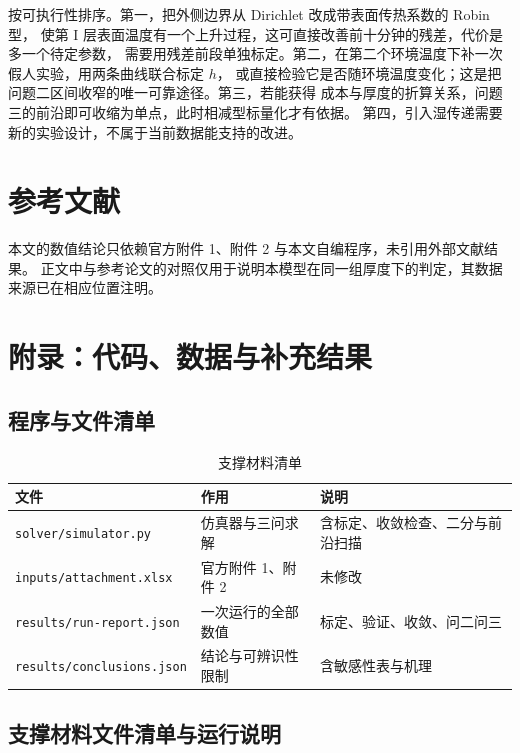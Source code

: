 \documentclass[withoutpreface,bwprint]{cumcmthesis}
\begin{document}
按可执行性排序。第一，把外侧边界从 Dirichlet 改成带表面传热系数的 Robin 型，
使第 I 层表面温度有一个上升过程，这可直接改善前十分钟的残差，代价是多一个待定参数，
需要用残差前段单独标定。第二，在第二个环境温度下补一次假人实验，用两条曲线联合标定 $h$，
或直接检验它是否随环境温度变化；这是把问题二区间收窄的唯一可靠途径。第三，若能获得
成本与厚度的折算关系，问题三的前沿即可收缩为单点，此时相减型标量化才有依据。
第四，引入湿传递需要新的实验设计，不属于当前数据能支持的改进。

\label{mcm-body-end}
\section{参考文献}

本文的数值结论只依赖官方附件 1、附件 2 与本文自编程序，未引用外部文献结果。
正文中与参考论文的对照仅用于说明本模型在同一组厚度下的判定，其数据来源已在相应位置注明。

\section{附录：代码、数据与补充结果}

\subsection{程序与文件清单}

\begin{table}[htbp]
  \centering
  \caption{支撑材料清单}
  \label{tab:materials}
  \begin{tabular}{lll}
    \toprule
    文件 & 作用 & 说明 \\
    \midrule
    \texttt{solver/simulator.py} & 仿真器与三问求解 & 含标定、收敛检查、二分与前沿扫描 \\
    \texttt{inputs/attachment.xlsx} & 官方附件 1、附件 2 & 未修改 \\
    \texttt{results/run-report.json} & 一次运行的全部数值 & 标定、验证、收敛、问二问三 \\
    \texttt{results/conclusions.json} & 结论与可辨识性限制 & 含敏感性表与机理 \\
    \bottomrule
  \end{tabular}
\end{table}

\subsection{支撑材料文件清单与运行说明}
\end{document}
